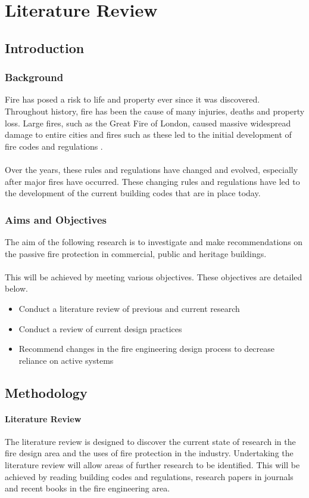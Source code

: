 \documentclass[table,a4paper,oneside]{book}
\begin{document}
\chapter{Literature Review}

\section{Introduction}
\subsection{Background}
Fire has posed a risk to life and property ever since it was discovered.  Throughout history, fire has been the cause of many injuries, deaths and property loss.  Large fires, such as the Great Fire of London, caused massive widespread damage to entire cities and fires such as these led to the initial development of fire codes and regulations \citep{Stollard1994}.
\\
\\
Over the years, these rules and regulations have changed and evolved, especially after major fires have occurred. These changing rules and regulations have led to the development of the current building codes that are in place today.
\subsection{Aims and Objectives}
The aim of the following research is to investigate and make recommendations on the passive fire protection in commercial, public and heritage buildings.
\\
\\
This will be achieved by meeting various objectives. These objectives are detailed below.
\begin{itemize}
\item Conduct a literature review of previous and current research
\item Conduct a review of current design practices
\item Recommend changes in the fire engineering design process to decrease reliance on active systems
\end{itemize}
\section{Methodology}
\subsubsection{Literature Review}
The literature review is designed to discover the current state of research in the fire design area and the uses of fire protection in the industry. Undertaking the literature review will allow areas of further research to be identified. This will be achieved by reading building codes and regulations, research papers in journals and recent books in the fire engineering area.
\end{document}

